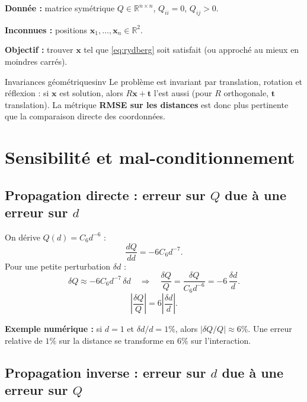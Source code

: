 \documentclass[12pt,a4paper]{article}
\newcommand{\R}{\mathbb{R}}
\begin{document}
\textbf{Donnée :} matrice symétrique $Q \in \R^{n\times n}$, $Q_{ii}=0$, $Q_{ij}>0$.

\textbf{Inconnues :} positions $\mathbf{x}_1,\ldots,\mathbf{x}_n \in \R^2$.

\textbf{Objectif :} trouver $\mathbf{x}$ tel que \eqref{eq:rydberg} soit satisfait
(ou approché au mieux en moindres carrés).

\begin{remarque}{Invariances géométriques}{inv}
Le problème est invariant par translation, rotation et réflexion :
si $\mathbf{x}$ est solution, alors $R\mathbf{x} + \mathbf{t}$ l'est aussi
(pour $R$ orthogonale, $\mathbf{t}$ translation).
La métrique \textbf{RMSE sur les distances} est donc plus pertinente que
la comparaison directe des coordonnées.
\end{remarque}

\section{Sensibilité et mal-conditionnement}

\subsection{Propagation directe : erreur sur $Q$ due à une erreur sur $d$}

On dérive $Q(d) = C_6 d^{-6}$ :
\[
  \frac{dQ}{dd} = -6 C_6 d^{-7}.
\]
Pour une petite perturbation $\delta d$ :
\[
  \delta Q \approx -6 C_6 d^{-7}\,\delta d
  \quad\Rightarrow\quad
  \frac{\delta Q}{Q} = \frac{\delta Q}{C_6 d^{-6}}
  = -6\,\frac{\delta d}{d}.
\]
\begin{equation}\label{eq:sens-direct}
  \boxed{\left|\frac{\delta Q}{Q}\right| = 6\left|\frac{\delta d}{d}\right|.}
\end{equation}

\textbf{Exemple numérique :} si $d = 1$ et $\delta d/d = 1\%$, alors
$|\delta Q/Q| \approx 6\%$. Une erreur relative de $1\%$ sur la distance
se transforme en $6\%$ sur l'interaction.

\subsection{Propagation inverse : erreur sur $d$ due à une erreur sur $Q$}
\end{document}
